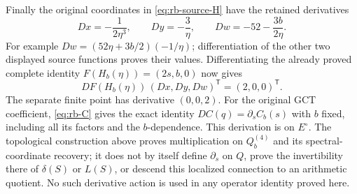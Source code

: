 Finally the original coordinates in \eqref{eq:rb-source-H} have
the retained derivatives
\[
 Dx=-\frac1{2\eta^3},\qquad
 Dy=-\frac3\eta,\qquad
 Dw=-52-\frac{3b}{2\eta}.
\]
For example $Dw=(52\eta+3b/2)(-1/\eta)$; differentiation of the
other two displayed source functions proves their values.
Differentiating the already proved complete identity
$F(H_b(\eta))=(2s,b,0)$ now gives
\[
 DF(H_b(\eta))\,(Dx,Dy,Dw)^{\mathsf T}=(2,0,0)^{\mathsf T}.
\]
The separate finite point has derivative $(0,0,2)$.
For the original GCT coefficient, \eqref{eq:rb-C} gives the exact
identity $DC(q)=\partial_s C_b(s)$ with $b$ fixed, including all
its factors and the $b$-dependence. This derivation is on
$E^\circ$. The topological construction above proves multiplication
on $Q_b^{(4)}$ and its spectral-coordinate recovery; it does not
by itself define $\partial_s$ on $Q$, prove the invertibility there
of $\delta(S)$ or $L(S)$, or descend this localized connection to
an arithmetic quotient. No such derivative action is used in any
operator identity proved here.
